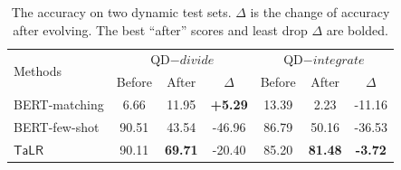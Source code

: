 \begin{table}[th]
\small
\setlength{\tabcolsep}{1.8pt}
  \begin{threeparttable}[b]
  \caption{The accuracy on two dynamic test sets. $\Delta$ is the change
  of accuracy after evolving. The best ``after'' scores and least drop $\Delta$ are bolded.}
  \label{tb:evolve}
  \centering
  \begin{tabular}{l|ccc|ccc}
    \toprule
    \multirow{2}{*}{Methods} & \multicolumn{3}{c|}{QD$-divide$} & \multicolumn{3}{c}{QD$-integrate$}\\
    \cline{2-7}
    & Before & After & $\Delta$ & Before & After & $\Delta$ \\
    \midrule
    BERT-matching & 6.66 & 11.95 & \textbf{+5.29} & 13.39 & 2.23 & -11.16\\
    BERT-few-shot & 90.51 & 43.54 & -46.96 & 86.79 & 50.16 & -36.53\\
    \midrule
    $\mathsf{TaLR}$ & 90.11 & \textbf{69.71} & -20.40 & 85.20 & \textbf{81.48} & \textbf{-3.72}\\
    \bottomrule
  \end{tabular}
  \end{threeparttable}
\end{table}


